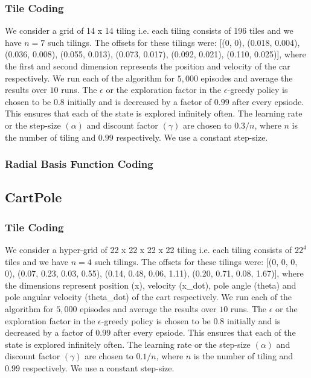 \documentclass{article}
\begin{document}
        \subsubsection{Tile Coding}
        We consider a grid of 14 x 14 tiling i.e. each tiling consists of 196 tiles and we have $n=7$ such tilings. The offsets for these tilings were:
        [(0, 0), (0.018, 0.004), (0.036, 0.008), (0.055, 0.013), (0.073, 0.017), (0.092, 0.021), (0.110, 0.025)], where the first and second dimension represents 
        the position and velocity of the car respectively. We run each of the algorithm for $5,000$ episodes and 
        average the results over $10$ runs. The $\epsilon$ or the exploration factor in the $\epsilon$-greedy policy is chosen to be $0.8$ initially and is 
        decreased by a factor of $0.99$ after every epsiode. This ensures that each of the state is explored infinitely often. The learning rate or the step-size 
        $(\alpha)$ and discount factor $(\gamma)$ are chosen to $0.3/n$, where $n$ is the number of tiling and $0.99$ respectively. We use a constant step-size.

        \subsubsection{Radial Basis Function Coding}

    \subsection{CartPole}
        \subsubsection{Tile Coding}
        We consider a hyper-grid of 22 x 22 x 22 x 22 tiling i.e. each tiling consists of $22^{4}$ tiles and we have $n=4$ such tilings. The offsets for these 
        tilings were: [(0, 0, 0, 0), (0.07, 0.23, 0.03, 0.55), (0.14, 0.48, 0.06, 1.11), (0.20, 0.71, 0.08, 1.67)], where the dimensions represent position (x), 
        velocity (x\_dot), pole angle (theta) and pole angular velocity (theta\_dot) of the cart respectively. We run each of the algorithm for $5,000$ episodes and 
        average the results over $10$ runs. The $\epsilon$ or the exploration factor in the $\epsilon$-greedy policy is chosen to be $0.8$ initially and is 
        decreased by a factor of $0.99$ after every epsiode. This ensures that each of the state is explored infinitely often. The learning rate or the step-size 
        $(\alpha)$ and discount factor $(\gamma)$ are chosen to $0.1/n$, where $n$ is the number of tiling and $0.99$ respectively. We use a constant step-size.
\end{document}
